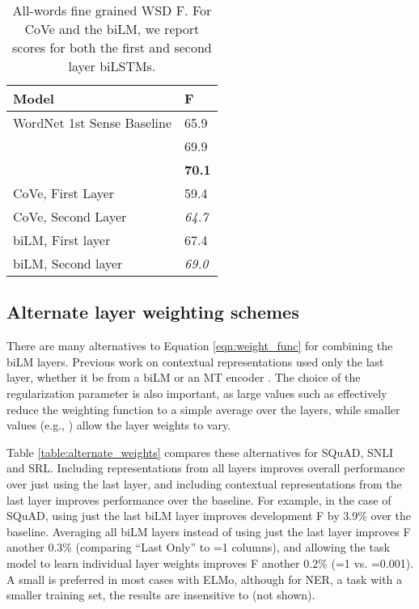 \documentclass[11pt,a4paper]{article}
\newcommand{\ELMO}{ELMo}
\begin{document}
\begin{table}
\centering
\begin{tabular}{l|l}
 \textbf{Model} & \textbf{F} \\ \hline \hline
WordNet 1st Sense  Baseline & 65.9 \\
\citet{Raganato2017NeuralSL} & 69.9 \\
\citet{Iacobacci2016EmbeddingsFW} & \textbf{70.1} \\ \hline
CoVe, First Layer & 59.4 \\
CoVe, Second Layer  & \textit{64.7} \\\hline
biLM, First layer & 67.4 \\
biLM, Second layer & \textit{69.0}
\end{tabular}
\caption{All-words fine grained WSD F.
For CoVe and the biLM, we report scores for both the first and second layer biLSTMs.}
\label{table:wsd}
\end{table}


\subsection{Alternate layer weighting schemes}
\label{sec:alternate_weighting}
There are many alternatives to Equation \ref{eqn:weight_func} for combining the biLM layers.
Previous work on contextual representations used only the last layer, whether it be from a biLM \citep{Peters2017SemisupervisedST} or an MT encoder \citep[CoVe;][]{McCann2017LearnedIT}.
The choice of the regularization parameter  is also important, as large values such as  effectively reduce the weighting function to a simple average over the layers, while smaller values (e.g., ) allow the layer weights to vary.

Table \ref{table:alternate_weights} compares these alternatives for SQuAD, SNLI and SRL.
Including representations from all layers improves overall performance over just using the last layer, and including contextual representations from the last layer improves performance over the baseline.
For example, in the case of SQuAD, using just the last biLM layer improves development F by 3.9\% over the baseline.  Averaging all biLM layers instead of using just the last layer improves F another 0.3\% (comparing ``Last Only'' to =1 columns), and allowing the task model to learn individual layer weights improves F another 0.2\% (=1 vs. =0.001).
A small  is preferred in most cases with \ELMO, although for NER, a task with a smaller training set, the results are insensitive to  (not shown).
\end{document}
